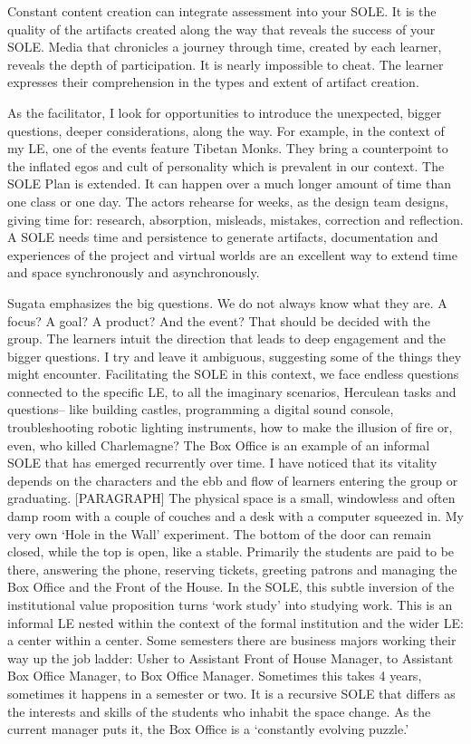 Constant content creation can integrate assessment into your SOLE. It is
the quality of the artifacts created along the way that reveals the
success of your SOLE. Media that chronicles a journey through time,
created by each learner, reveals the depth of participation. It is
nearly impossible to cheat. The learner expresses their comprehension in
the types and extent of artifact creation.

As the facilitator, I look for opportunities to introduce the
unexpected, bigger questions, deeper considerations, along the way. For
example, in the context of my LE, one of the events feature Tibetan
Monks. They bring a counterpoint to the inflated egos and cult of
personality which is prevalent in our context. The SOLE Plan is
extended. It can happen over a much longer amount of time than one class
or one day. The actors rehearse for weeks, as the design team designs,
giving time for: research, absorption, misleads, mistakes, correction
and reflection. A SOLE needs time and persistence to generate artifacts,
documentation and experiences of the project and virtual worlds are an
excellent way to extend time and space synchronously and asynchronously.

Sugata emphasizes the big questions. We do not always know what they
are. A focus? A goal? A product? And the event? That should be decided
with the group. The learners intuit the direction that leads to deep
engagement and the bigger questions. I try and leave it ambiguous,
suggesting some of the things they might encounter. Facilitating the
SOLE in this context, we face endless questions connected to the
specific LE, to all the imaginary scenarios, Herculean tasks and
questions-- like building castles, programming a digital sound console,
troubleshooting robotic lighting instruments, how to make the illusion
of fire or, even, who killed Charlemagne? The Box Office is an example
of an informal SOLE that has emerged recurrently over time. I have
noticed that its vitality depends on the characters and the ebb and flow
of learners entering the group or graduating. {[}PARAGRAPH{]} The
physical space is a small, windowless and often damp room with a couple
of couches and a desk with a computer squeezed in. My very own `Hole in
the Wall' experiment. The bottom of the door can remain closed, while
the top is open, like a stable. Primarily the students are paid to be
there, answering the phone, reserving tickets, greeting patrons and
managing the Box Office and the Front of the House. In the SOLE, this
subtle inversion of the institutional value proposition turns `work
study' into studying work. This is an informal LE nested within the
context of the formal institution and the wider LE: a center within a
center. Some semesters there are business majors working their way up
the job ladder: Usher to Assistant Front of House Manager, to Assistant
Box Office Manager, to Box Office Manager. Sometimes this takes 4 years,
sometimes it happens in a semester or two. It is a recursive SOLE that
differs as the interests and skills of the students who inhabit the
space change. As the current manager puts it, the Box Office is a
`constantly evolving puzzle.'


